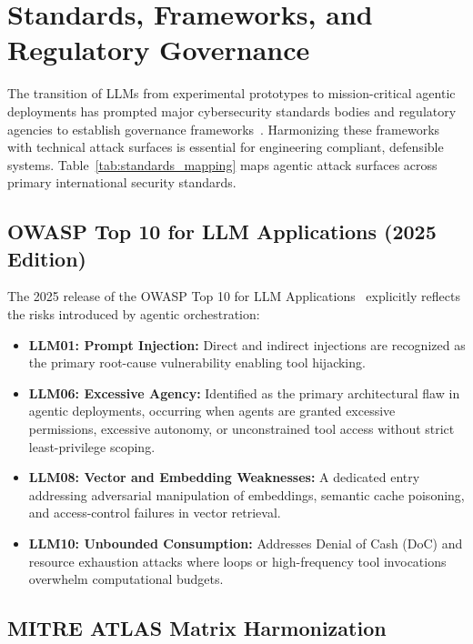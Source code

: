 \section{Standards, Frameworks, and Regulatory Governance}
\label{sec:standards}

The transition of LLMs from experimental prototypes to mission-critical agentic deployments has prompted major cybersecurity standards bodies and regulatory agencies to establish governance frameworks~\cite{hasselwander2026agentic}. Harmonizing these frameworks with technical attack surfaces is essential for engineering compliant, defensible systems. Table~\ref{tab:standards_mapping} maps agentic attack surfaces across primary international security standards.



\subsection{OWASP Top 10 for LLM Applications (2025 Edition)}
\label{subsec:owasp_mapping}

The 2025 release of the OWASP Top 10 for LLM Applications~\cite{owasp2025top10, promptfoo2025owasp} explicitly reflects the risks introduced by agentic orchestration:
\begin{itemize}
    \item \textbf{LLM01: Prompt Injection:} Direct and indirect injections are recognized as the primary root-cause vulnerability enabling tool hijacking.
    \item \textbf{LLM06: Excessive Agency:} Identified as the primary architectural flaw in agentic deployments, occurring when agents are granted excessive permissions, excessive autonomy, or unconstrained tool access without strict least-privilege scoping.
    \item \textbf{LLM08: Vector and Embedding Weaknesses:} A dedicated entry addressing adversarial manipulation of embeddings, semantic cache poisoning, and access-control failures in vector retrieval.
    \item \textbf{LLM10: Unbounded Consumption:} Addresses Denial of Cash (DoC) and resource exhaustion attacks where loops or high-frequency tool invocations overwhelm computational budgets.
\end{itemize}

\subsection{MITRE ATLAS Matrix Harmonization}
\label{subsec:mitre_atlas}

